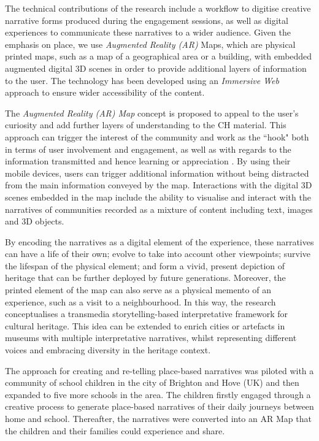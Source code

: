 \documentclass[acmlarge,screen,dvipsnames]{acmart}
\begin{document}
The technical contributions of the research include a workflow to digitise creative narrative forms produced during the engagement sessions, as well as digital experiences to communicate these narratives to a wider audience. Given the emphasis on place, we use \emph{Augmented Reality (AR)} Maps, which are physical printed
maps, such as a map of a geographical area or a building, with embedded augmented digital 3D scenes in order to provide additional layers of information to the user. The technology has been developed using an
\emph{Immersive Web} approach to ensure wider accessibility of the content.

The \emph{Augmented Reality (AR) Map} concept is proposed to appeal to the
user's curiosity and add further layers of understanding to the CH material. This approach can trigger the interest of the community and work as the ``hook" both in terms of user involvement and engagement, as well as with regards to the information
transmitted and hence learning or appreciation \cite{Csikszentmihalyi1995}. By using their mobile devices, users can trigger additional
information without being distracted from the main information conveyed by the
map. Interactions with the digital 3D scenes embedded in the map include
the ability to visualise and interact with the narratives of communities
recorded as a mixture of content including text, images and 3D objects.    

By encoding the narratives as a digital element of the experience, these
narratives can have a life of their own; evolve to take into account
other viewpoints; survive the lifespan of the physical element; and form
a vivid, present depiction of heritage that can be further deployed by future
generations. Moreover, the printed element of the map can also serve as a physical
memento of an experience, such as a visit to a neighbourhood. In this
way, the research conceptualises a transmedia storytelling-based
interpretative framework for cultural heritage. This idea can be
extended to enrich cities or artefacts in museums with multiple
interpretative narratives, whilst representing different voices and embracing
diversity in the heritage context.

The approach for creating and re-telling place-based narratives was
piloted with a community of school children in the city of Brighton and
Hove (UK) and then expanded to five more schools in the area. The children firstly engaged through a creative process to generate place-based narratives of their
daily journeys between home and school. Thereafter, the narratives were
converted into an AR Map that the children and their families could
experience and share.
\end{document}
